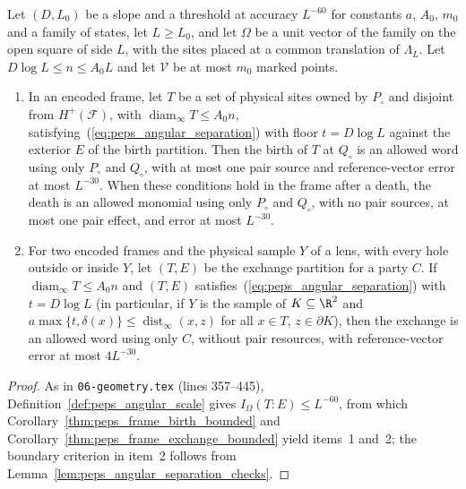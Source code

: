 \begin{lemma}
    \label{thm:peps_bulk_steps}
    \leanok
    Let $(D,L_0)$ be a slope and a threshold at accuracy $L^{-60}$ for
    constants $a$, $A_0$, $m_0$ and a family of states, let $L\ge L_0$, and let
    $\Omega$ be a unit vector of the family on the open square of side $L$,
    with the sites placed at a common translation of $\Lambda_L$.
    Let $D\log L\le n\le A_0L$ and let $\mathcal V$ be at most $m_0$ marked
    points.
    \begin{enumerate}
        \item In an encoded frame, let $T$ be a set of physical sites owned by
              $P_\circ$ and disjoint from $H^+(\mathcal F)$, with $\operatorname{diam}_\infty T\le A_0n$, satisfying~(\ref{eq:peps_angular_separation}) with floor
              $t=D\log L$ against the exterior $E$ of the birth partition. Then
              the birth of $T$ at $Q_\circ$ is an allowed word using only
              $P_\circ$ and $Q_\circ$, with at most one pair source and
              reference-vector error at most $L^{-30}$. When these conditions
              hold in the frame after a death, the death is an allowed monomial
              using only $P_\circ$ and $Q_\circ$, with no pair sources, at
              most one pair effect, and error at most $L^{-30}$.
        \item For two encoded frames and the physical sample $Y$ of a lens, with
              every hole outside or inside $Y$, let $(T,E)$ be the exchange partition for a party $C$. If $\operatorname{diam}_\infty T\le A_0n$ and $(T,E)$ satisfies~(\ref{eq:peps_angular_separation}) with $t=D\log L$ (in particular, if $Y$ is the sample of $K\subseteq\R^2$ and $a\max\{t,\delta(x)\}\le\operatorname{dist}_\infty(x,z)$ for all $x\in T$, $z\in\partial K$),
              then the exchange is an allowed word using only $C$, without pair
              resources, with reference-vector error at most $4L^{-30}$.
    \end{enumerate}
\end{lemma}

\begin{proof}\leanok
    As in \texttt{06-geometry.tex} (lines 357--445), Definition~\ref{def:peps_angular_scale} gives $I_\Omega(T:E)\le L^{-60}$,
    from which Corollary~\ref{thm:peps_frame_birth_bounded} and Corollary~\ref{thm:peps_frame_exchange_bounded} yield items~1 and~2; the boundary criterion in item~2 follows from
    Lemma~\ref{lem:peps_angular_separation_checks}.
\end{proof}

